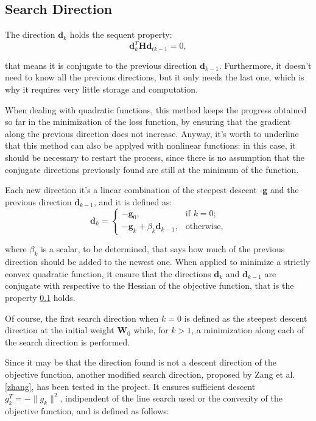 		\subsection{Search Direction}
		\label{sub:search_direction}
			The direction $\textbf{d}_k$ holds the sequent property:
			\begin{equation}
			\textbf{d}_k^T\textbf{H}\textbf{d}_{tk-1} = 0,
			\end{equation}

		 	that means it is conjugate to the previous direction $\textbf{d}_{k-1}$. Furthermore, it doesn't need to know all the 	previous directions, but it only needs the last one, which is why it requires very little storage and computation.

			When dealing with quadratic functions, this method keeps the progress obtained so far in the minimization of the loss function, by ensuring that the gradient along the previous direction does not increase.
			Anyway, it's worth to underline that this method can also be applyed with nonlinear functions: in this case, it should be necessary to restart the process, since there is no assumption that the conjugate directions previously found are still at the minimum of the function.

			Each new direction it's a linear combination of the steepest descent -\textbf{g} and the previous direction $\textbf{d}_{k-1}$, and it is defined as:
			\begin{equation}
			\label{dir}
			  \textbf{d}_k=\begin{cases}
			    -\textbf{g}_0, & \text{if $k=0$};\\
			    -\textbf{g}_k + \beta_k\textbf{d}_{k-1}, & \text{otherwise,}
			  \end{cases}
			\end{equation}

			where $\beta_k$ is a scalar, to be determined, that says how much of the previous direction should be added to the newest one. When applied to minimize a strictly convex quadratic function, it ensure that the directions $\textbf{d}_{k}$ and $\textbf{d}_{k-1}$ are conjugate with respective to the Hessian of the objective function, that is the property \ref{sub:search_direction} holds.

			Of course, the first search direction when $k = 0$ is defined as the steepest descent direction at the initial weight $\textbf{W}_0$ while, for $k > 1$, a minimization along each of the search direction is performed.

			Since it may be that the direction found is not a descent direction of the objective function, another modified search direction, proposed by Zang et al.\ref{zhang}, has been tested in the project. It ensures sufficient descent $g_k^T = -\|g_k\|^2$, indipendent of the line search used or the convexity of the objective function, and is defined as follows:

